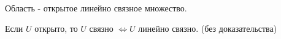 \begin{definition} \thmslashn 

    Область - открытое линейно связное множество.
\end{definition}
\begin{remark} \thmslashn

    Если $U$ открыто, то $U$ связно $\iff U$ линейно связно. (без доказательства)
\end{remark}
